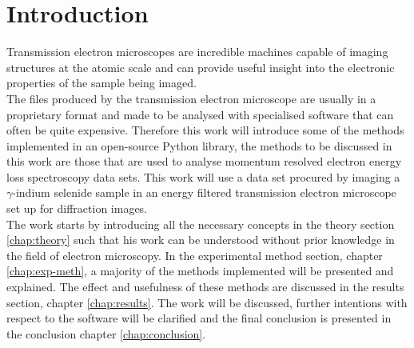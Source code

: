 \section{Introduction}
Transmission electron microscopes are incredible machines capable of imaging structures at the atomic scale and can provide useful insight into the electronic properties of the sample being imaged.\\
The files produced by the transmission electron microscope are usually in a proprietary format and made to be analysed with specialised software that can often be quite expensive. Therefore this work will introduce some of the methods implemented in an open-source Python library, the methods to be discussed in this work are those that are used to analyse momentum resolved electron energy loss spectroscopy data sets. This work will use a data set procured by imaging a $\gamma$-indium selenide sample in an energy filtered transmission electron microscope set up for diffraction images.\\
The work starts by introducing all the necessary concepts in the theory section \ref{chap:theory} such that his work can be understood without prior knowledge in the field of electron microscopy. In the experimental method section, chapter \ref{chap:exp-meth}, a majority of the methods implemented will be presented and explained. The effect and usefulness of these methods are discussed in the results section, chapter \ref{chap:results}. The work will be discussed, further intentions with respect to the software will be clarified and the final conclusion is presented in the conclusion chapter \ref{chap:conclusion}.





